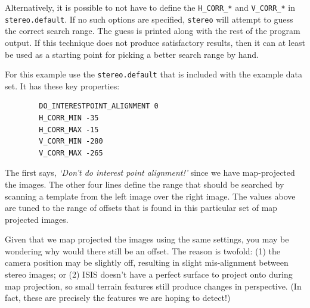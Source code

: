 Alternatively, it is possible to not have to define the
\texttt{H\_CORR\_*} and \texttt{V\_CORR\_*} in
\texttt{stereo.default}. If no such options are specified,
\texttt{stereo} will attempt to guess the correct search range. The
guess is printed along with the rest of the program output.  If this
technique does not produce satisfactory results, then it can at least
be used as a starting point for picking a better search range by hand.

For this example use the \texttt{stereo.default} that is included with
the example data set. It has these key properties:

\begin{verbatim}
        DO_INTERESTPOINT_ALIGNMENT 0
        H_CORR_MIN -35
        H_CORR_MAX -15
        V_CORR_MIN -280
        V_CORR_MAX -265
\end{verbatim}
\noindent

The first says, \emph{`Don't do interest point alignment!'} since we
have map-projected the images. The other four lines define the range
that should be searched by scanning a template from the left image
over the right image. The values above are tuned to the range of
offsets that is found in this particular set of map projected images.

Given that we map projected the images using the same settings, you
may be wondering why would there still be an offset. The reason is
twofold: (1) the camera position may be slightly off, resulting in
slight mis-alignment between stereo images; or (2) \ac{ISIS} doesn't
have a perfect surface to project onto during map projection, so small
terrain features still produce changes in perspective.  (In fact,
these are precisely the features we are hoping to detect!)

\begin{center}
\end{center}


